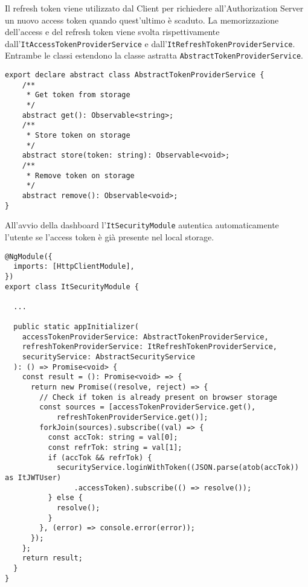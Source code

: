 \FloatBarrier 
Il refresh token viene utilizzato dal Client per richiedere all'Authorization Server un nuovo access token quando quest'ultimo è scaduto.
La memorizzazione dell'access e del refresh token viene svolta rispettivamente dall'\verb|ItAccessTokenProviderService| e dall'\verb|ItRefreshTokenProviderService|.
Entrambe le classi estendono la classe astratta \verb|AbstractTokenProviderService|.\\
\begin{lstlisting}[caption={Classe astratta AbstractTokenProviderService}, style=javaScriptCode]
export declare abstract class AbstractTokenProviderService {
    /**
     * Get token from storage
     */
    abstract get(): Observable<string>;
    /**
     * Store token on storage
     */
    abstract store(token: string): Observable<void>;
    /**
     * Remove token on storage
     */
    abstract remove(): Observable<void>;
}
\end{lstlisting}
All'avvio della dashboard l'\verb|ItSecurityModule| autentica automaticamente l'utente se l'access token è già presente nel local storage.\newline
\begin{lstlisting}[caption={Login con token nell'ItSecurityModule}, style=javaScriptCode]
@NgModule({
  imports: [HttpClientModule],
})
export class ItSecurityModule {
    
  ...

  public static appInitializer(
    accessTokenProviderService: AbstractTokenProviderService,
    refreshTokenProviderService: ItRefreshTokenProviderService,
    securityService: AbstractSecurityService
  ): () => Promise<void> {
    const result = (): Promise<void> => {
      return new Promise((resolve, reject) => {
        // Check if token is already present on browser storage
        const sources = [accessTokenProviderService.get(), 
            refreshTokenProviderService.get()];
        forkJoin(sources).subscribe((val) => {
          const accTok: string = val[0];
          const refrTok: string = val[1];
          if (accTok && refrTok) {
            securityService.loginWithToken((JSON.parse(atob(accTok)) as ItJWTUser)
                .accessToken).subscribe(() => resolve());
          } else {
            resolve();
          }
        }, (error) => console.error(error));
      });
    };
    return result;
  }
}
\end{lstlisting}
\pagebreak
